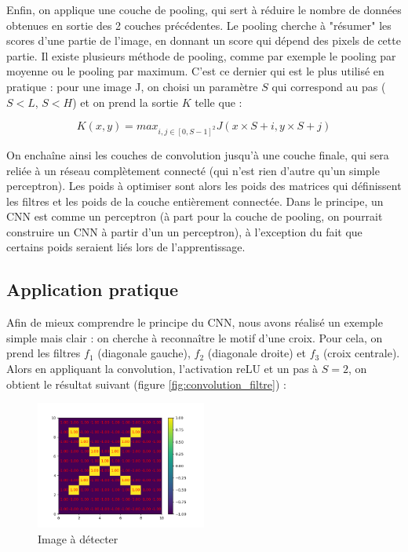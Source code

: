 Enfin, on applique une couche de pooling, qui sert à réduire le nombre de données obtenues en sortie des 2 couches précédentes.
Le pooling cherche à "résumer" les scores d'une partie de l'image, en donnant un score qui dépend des pixels de cette partie.
Il existe plusieurs méthode de pooling, comme par exemple le pooling par moyenne ou le pooling par maximum. C'est ce dernier qui est le plus utilisé en pratique :
pour une image J, on choisi un paramètre $S$ qui correspond au pas ($S < L$, $S<H$) et on prend la sortie $K$ telle que :

\begin{equation}
    K(x, y) = max_{i,j \in [0, S-1] ^2 } { J(x \times S + i , y \times S + j ) }
\end{equation}


On enchaîne ainsi les couches de convolution jusqu'à une couche finale, qui sera reliée à un réseau complètement connecté (qui n'est rien d'autre qu'un simple perceptron).
Les poids à optimiser sont alors les poids des matrices qui définissent les filtres et les poids de la couche entièrement connectée.
Dans le principe, un CNN est comme un perceptron (à part pour la couche de pooling, on pourrait construire un CNN à partir d'un un perceptron), à l'exception du fait que certains poids seraient liés lors de l'apprentissage.

\subsection{Application pratique}

Afin de mieux comprendre le principe du CNN, nous avons réalisé un exemple simple mais clair : on cherche à reconnaître le motif d'une croix.
Pour cela, on prend les filtres $f_1$ (diagonale gauche), $f_2$ (diagonale droite) et $f_3$ (croix centrale).
Alors en appliquant la convolution, l'activation reLU et un pas à $S = 2$, on obtient le résultat suivant (figure \ref{fig:convolution_filtre}) :

\begin{figure}[h]
    \center
    \includegraphics[width=0.5\textwidth]{img/cnn_exemple/cross/image_croix.png}
    \caption{Image à détecter}
\end{figure}


